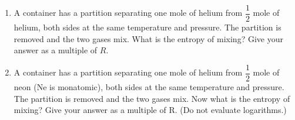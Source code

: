 \documentclass[fleqn]{article}
\begin{document}
\begin{enumerate}

    \item A container has a partition separating one mole of helium from $\dfrac{1}{2}$ mole of helium, both sides at
    the same temperature and pressure. The partition is removed and the two gases mix. What is the entropy of 
    mixing? Give your answer as a multiple of $R$.


    \item A container has a partition separating one mole of helium from $\dfrac{1}{2}$ mole of neon 
    (Ne is monatomic), both sides at the same temperature and pressure. The partition is removed and 
    the two gases mix. Now what is the entropy of mixing? Give your answer as a multiple of R. (Do not evaluate
    logarithms.)


  \end{enumerate}
\end{document}
